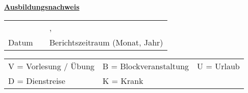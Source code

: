 \begin{center}
	\textbf{\uline{Ausbildungsnachweis}}
\end{center}

\begin{supertabular}{m{7.8cm}m{0.1cm}m{7.8cm}}
	\centering \Datum & & \centering\arraybslash \Monat, \Jahr\\
	\hhline{-~-}
	\centering Datum & & \centering\arraybslash Berichtszeitraum (Monat, Jahr)\\
\end{supertabular}

\begin{center}
	\begin{tabular}{lll}
		V = Vorlesung / Übung &	B = Blockveranstaltung & U = Urlaub\\
		D = Dienstreise & K = Krank &\\
	\end{tabular}
\end{center}

